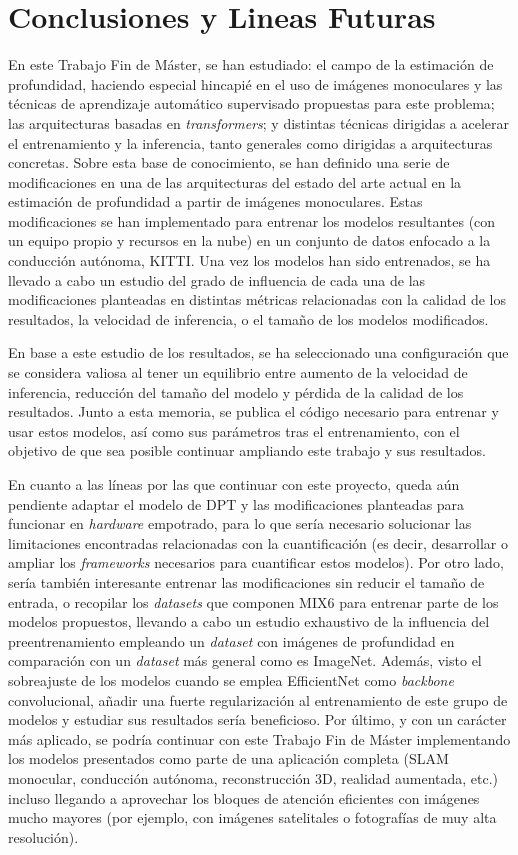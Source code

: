 \section{Conclusiones y Lineas Futuras}
En este Trabajo Fin de Máster, se han estudiado: el campo de la estimación de profundidad, haciendo especial hincapié en el uso de imágenes monoculares y las técnicas de aprendizaje automático supervisado propuestas para este problema; las arquitecturas basadas en \textit{transformers}; y distintas técnicas dirigidas a acelerar el entrenamiento y la inferencia, tanto generales como dirigidas a arquitecturas concretas. Sobre esta base de conocimiento, se han definido una serie de modificaciones en una de las arquitecturas del estado del arte actual en la estimación de profundidad a partir de imágenes monoculares. Estas modificaciones se han implementado para entrenar los modelos resultantes (con un equipo propio y recursos en la nube) en un conjunto de datos enfocado a la conducción autónoma, KITTI. Una vez los modelos han sido entrenados, se ha llevado a cabo un estudio del grado de influencia de cada una de las modificaciones planteadas en distintas métricas relacionadas con la calidad de los resultados, la velocidad de inferencia, o el tamaño de los modelos modificados. 

En base a este estudio de los resultados, se ha seleccionado una configuración que se considera valiosa al tener un equilibrio entre aumento de la velocidad de inferencia, reducción del tamaño del modelo y pérdida de la calidad de los resultados. Junto a esta memoria, se publica el código necesario para entrenar y usar estos modelos, así como sus parámetros tras el entrenamiento, con el objetivo de que sea posible continuar ampliando este trabajo y sus resultados.

En cuanto a las líneas por las que continuar con este proyecto, queda aún pendiente adaptar el modelo de DPT y las modificaciones planteadas para funcionar en \textit{hardware} empotrado, para lo que sería necesario solucionar las limitaciones encontradas relacionadas con la cuantificación (es decir, desarrollar o ampliar los \textit{frameworks} necesarios para cuantificar estos modelos). Por otro lado, sería también interesante entrenar las modificaciones sin reducir el tamaño de entrada, o recopilar los \textit{datasets} que componen MIX6 para entrenar parte de los modelos propuestos, llevando a cabo un estudio exhaustivo de la influencia del preentrenamiento empleando un \textit{dataset} con imágenes de profundidad en comparación con un \textit{dataset} más general como es ImageNet. Además, visto el sobreajuste de los modelos cuando se emplea EfficientNet como \textit{backbone} convolucional, añadir una fuerte regularización al entrenamiento de este grupo de modelos y estudiar sus resultados sería beneficioso. Por último, y con un carácter más aplicado, se podría continuar con este Trabajo Fin de Máster implementando los modelos presentados como parte de una aplicación completa (SLAM monocular, conducción autónoma, reconstrucción 3D, realidad aumentada, etc.) incluso llegando a aprovechar los bloques de atención eficientes con imágenes mucho mayores (por ejemplo, con imágenes satelitales o fotografías de muy alta resolución).

